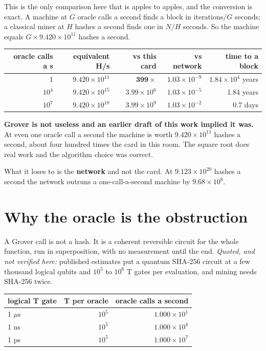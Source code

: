 This is the only comparison here that is apples to apples, and the conversion is exact. A machine at
\(G\) oracle calls a second finds a block in \(\text{iterations}/G\) seconds; a classical miner at
\(H\) hashes a second finds one in \(N/H\) seconds. So the machine equals
\(G \times 9.420 \times 10^{11}\) hashes a second.

\begin{center}
\begin{tabular}{rrrrr}
\toprule
oracle calls a s & equivalent H/s & vs this card & vs network & time to a block \\
\midrule
1 & \(9.420 \times 10^{11}\) & \(\mathbf{399\times}\) & \(1.03 \times 10^{-9}\) & \(1.84 \times 10^{4}\) years \\
\(10^{4}\) & \(9.420 \times 10^{15}\) & \(3.99 \times 10^{6}\) & \(1.03 \times 10^{-5}\) & 1.84 years \\
\(10^{7}\) & \(9.420 \times 10^{18}\) & \(3.99 \times 10^{9}\) & \(1.03 \times 10^{-2}\) & 0.7 days \\
\bottomrule
\end{tabular}
\end{center}

\textbf{Grover is not useless and an earlier draft of this work implied it was.} At even one oracle
call a second the machine is worth \(9.420 \times 10^{11}\) hashes a second, about four hundred times
the card in this room. The square root does real work and the algorithm choice was correct.

What it loses to is the \textbf{network} and not the card. At \(9.123 \times 10^{20}\) hashes a
second the network outruns a one-call-a-second machine by \(9.68 \times 10^{8}\).

\section{Why the oracle is the obstruction}

A Grover call is not a hash. It is a coherent reversible circuit for the whole function, run in
superposition, with no measurement until the end. \emph{Quoted, and not verified here:} published
estimates put a quantum SHA-256 circuit at a few thousand logical qubits and \(10^{5}\) to
\(10^{6}\) T gates per evaluation, and mining needs SHA-256 twice.

\begin{center}
\begin{tabular}{lrr}
\toprule
logical T gate & T per oracle & oracle calls a second \\
\midrule
1 \(\mu\)s & \(10^{5}\) & \(1.000 \times 10^{1}\) \\
1 ns & \(10^{5}\) & \(1.000 \times 10^{4}\) \\
1 ps & \(10^{5}\) & \(1.000 \times 10^{7}\) \\
\bottomrule
\end{tabular}
\end{center}

